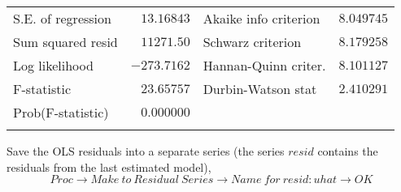 \documentclass[12pt]{report}
\begin{document}
\begin{table}[!htbp]
\begin{tabular}{lrrrr}
		\multicolumn{1}{l}{S.E. of regression}&\multicolumn{1}{r}{$13.16843$}&\multicolumn{2}{l}{Akaike info criterion}&\multicolumn{1}{r}{$8.049745$}\\
		\multicolumn{1}{l}{Sum squared resid}&\multicolumn{1}{r}{$11271.50$}&\multicolumn{2}{l}{Schwarz criterion}&\multicolumn{1}{r}{$8.179258$}\\
		\multicolumn{1}{l}{Log likelihood}&\multicolumn{1}{r}{$-273.7162$}&\multicolumn{2}{l}{Hannan-Quinn criter.}&\multicolumn{1}{r}{$8.101127$}\\
		\multicolumn{1}{l}{F-statistic}&\multicolumn{1}{r}{$23.65757$}&\multicolumn{2}{l}{Durbin-Watson stat}&\multicolumn{1}{r}{$2.410291$}\\
		\multicolumn{1}{l}{Prob(F-statistic)}&\multicolumn{1}{r}{$0.000000$}&\multicolumn{1}{c}{}&\multicolumn{1}{c}{}&\multicolumn{1}{c}{}\\
		[4.5pt] \hline \\ [-4.5pt]
	\end{tabular}
\end{table}


\noindent Save the OLS residuals into a separate series (the series $resid$ contains the residuals from the last estimated model),
$$Proc \to Make\ to\ Residual\ Series \to Name\ for\ resid:uhat \to OK$$
\begin{figure}[H]
	\centering
\end{figure}
\vspace{-\baselineskip}
\begin{figure}[H]
	\centering
\end{figure}
\vspace{-\baselineskip}
\begin{figure}[H]
	\centering
\end{figure}
\vspace{-\baselineskip}
\end{document}
